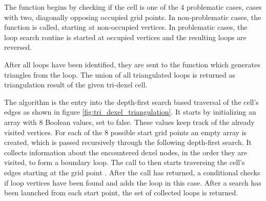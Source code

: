 %
The  function begins by checking if the cell is one of the 4 problematic cases, \ie cases with two, diagonally opposing occupied grid points.
In non-problematic cases, the  function is called, starting at non-occupied vertices.
In problematic cases, the loop search routine is started at occupied vertices and the resulting loops are reversed.

After all loops have been identified, they are sent to the  function which generates triangles from the loop.
The union of all triangulated loops is returned as triangulation result of the given tri-dexel cell.

The  algorithm is the entry into the depth-first search based traversal of the cell's edges as shown in figure \ref{fig:tri_dexel_triangulation}.
It starts by initializing an array with 8 Boolean values, set to false.
These values keep track of the already visited vertices.
For each of the 8 possible start grid points an empty array  is created, which is passed recursively through the following depth-first search.
It collects information about the encountered dexel nodes, in the order they are visited, to form a boundary loop.
The call to  then starts traversing the cell's edges starting at the grid point .
After the call has returned, a conditional checks if loop vertices have been found and adds the loop in this case.
After a search has been launched from each start point, the set of collected loops is returned.

